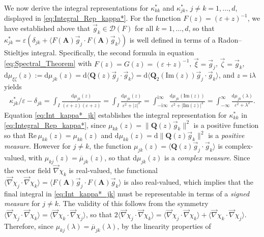 \documentclass[11pt]{amsart}
\newcommand{\I}{\mathrm{i}}
\renewcommand{\d}{\mathrm{d}}
\newcommand{\Ab}{\mathbf{A}}
\newcommand{\Qb}{\mathbf{Q}}
\newcommand{\Ds}{\mathscr{D}}
\begin{document}
We now derive the integral representations for $\kappa^*_{kk}$ and
$\kappa^*_{jk}$, $j\neq k=1,\ldots,d$, displayed in
\eqref{eq:Integral_Rep_kappa*}. For the function $F(z)=(\varepsilon+z)^{-1}$, we
have established above that $\vec{g}_k\in\Ds(F)$ for all
$k=1,\ldots,d$, so that
$\kappa^*_{jk}=\varepsilon(\delta_{jk}+\langle F(\Ab)\vec{g}_j\cdot F(\Ab)\vec{g}_k\rangle)$ is well defined
in terms of a Radon--Stieltjes integral. Specifically, the second
formula in equation \eqref{eq:Spectral_Theorem} with
$F(z)=G(z)=(\varepsilon+z)^{-1}$, $\vec{\xi}=\vec{g}_j$, $\vec{\zeta}=\vec{g}_k$,
$\d\mu_{\xi\zeta}(z):=\d\mu_{jk}(z)=\d\langle\Qb(z)\vec{g}_j\cdot\vec{g}_k\rangle
=\d\langle\Qb_2(\text{Im}(z))\vec{g}_j\cdot\vec{g}_k\rangle$, and $z=\I\lambda$
yields         
%
\begin{align}\label{eq:Int_kappa*_jk}
  \kappa^*_{jk}/\varepsilon-\delta_{jk}
               =\int_I\frac{\d\mu_{jk}(z)}{\overline{(\varepsilon+z)}(\varepsilon+z)}
               =\int_I\frac{\d\mu_{jk}(z)}{\varepsilon^2+|z|^2}
               =\int_{-\I\infty}^{\I\infty}\frac{\d\mu_{jk}(\text{Im}(z))}{\varepsilon^2+|\text{Im}(z)|^2}
               =\int_{-\infty}^\infty\frac{\d\mu_{jk}(\lambda)}{\varepsilon^2+\lambda^2}.
\end{align}
%
Equation \eqref{eq:Int_kappa*_jk} establishes the integral
representation for $\kappa^*_{kk}$ in \eqref{eq:Integral_Rep_kappa*}, since
$\mu_{kk}(z)=\|\Qb(z)\vec{g}_k\|^2$ is a positive function so that
$\text{Re}\,\mu_{kk}(z)=\mu_{kk}(z)$ and
$\d\mu_{kk}(z)=\d\|\Qb(z)\vec{g}_k\|^2$ is a \emph{positive 
  measure}. However for $j\neq k$, the function
$\mu_{jk}(z)=\langle\Qb(z)\vec{g}_j\cdot\vec{g}_k\rangle$ is complex-valued, with    
$\mu_{kj}(z)=\overline{\mu}_{jk}(z)$, so that $\d\mu_{jk}(z)$ is a
\emph{complex measure}. Since the vector field $\vec{\nabla}\chi_k$ is
real-valued, the 
functional $\langle\vec{\nabla}\chi_j\cdot\vec{\nabla}\chi_k\rangle=\langle F(\Ab)\vec{g}_j\cdot F(\Ab)\vec{g}_k\rangle$
is also real-valued, which implies that the final integral in
\eqref{eq:Int_kappa*_jk} must be representable in terms of a
\emph{signed measure} for $j\neq k$. The validity of this follows from the
symmetry $\langle\vec{\nabla}\chi_j\cdot\vec{\nabla}\chi_k\rangle=\langle\vec{\nabla}\chi_k\cdot\vec{\nabla}\chi_j\rangle$, so that
$2\langle\vec{\nabla}\chi_j\cdot\vec{\nabla}\chi_k\rangle=\langle\vec{\nabla}\chi_j\cdot\vec{\nabla}\chi_k\rangle+\langle\vec{\nabla}\chi_k\cdot\vec{\nabla}\chi_j\rangle$. Therefore, since
$\mu_{kj}(\lambda)=\overline{\mu}_{jk}(\lambda)$, by the linearity properties of
\end{document}
